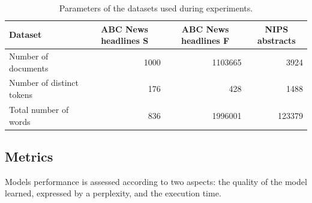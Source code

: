 \documentclass[journal]{IEEEtran}
\begin{document}
\renewcommand{\arraystretch}{1.2}
\begin{table}[t]
\centering
\caption{Parameters of the datasets used during experiments.}
\label{tab:datasets}
\begin{tabular}{lrrr} \toprule
Dataset                   & \multicolumn{1}{c}{ABC News headlines S} & \multicolumn{1}{c}{ABC News headlines F} & \multicolumn{1}{c}{NIPS abstracts} \\ \midrule
Number of documents       & 1000                                     & 1103665                                  & 3924                               \\
Number of distinct tokens & 176                                      & 428                                      & 1488                               \\
Total number of words     & 836                                      & 1996001                                  & 123379    \\ \bottomrule                        
\end{tabular}
\end{table}


\subsection{Metrics}
Models performance is assessed according to two aspects: the quality of the model learned, expressed by a perplexity, and the execution time.
\end{document}
